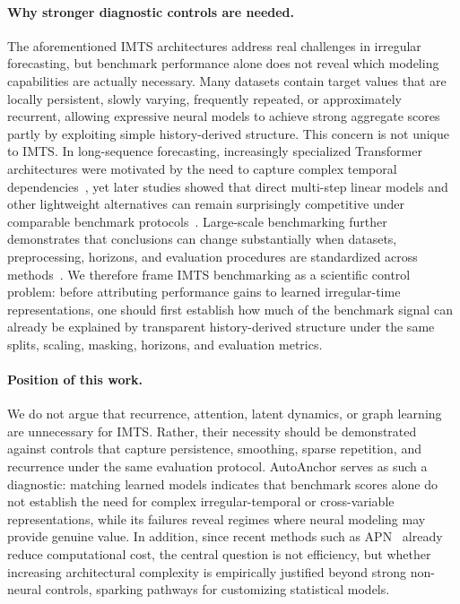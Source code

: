 \documentclass{article}
\begin{document}
\paragraph{Why stronger diagnostic controls are needed.}
The aforementioned IMTS architectures address real challenges in irregular forecasting, but benchmark performance alone does not reveal which modeling capabilities are actually necessary. Many datasets contain target values that are locally persistent, slowly varying, frequently repeated, or approximately recurrent, allowing expressive neural models to achieve strong aggregate scores partly by exploiting simple history-derived structure. This concern is not unique to IMTS. In long-sequence forecasting, increasingly specialized Transformer architectures were motivated by the need to capture complex temporal dependencies~\citep{informer}, yet later studies showed that direct multi-step linear models and other lightweight alternatives can remain surprisingly competitive under comparable benchmark protocols~\citep{Zeng2023LTSFLinear,SimpleTM2025}. Large-scale benchmarking further demonstrates that conclusions can change substantially when datasets, preprocessing, horizons, and evaluation procedures are standardized across methods~\citep{TFB2024}. We therefore frame IMTS benchmarking as a scientific control problem: before attributing performance gains to learned irregular-time representations, one should first establish how much of the benchmark signal can already be explained by transparent history-derived structure under the same splits, scaling, masking, horizons, and evaluation metrics.


\paragraph{Position of this work.}
We do not argue that recurrence, attention, latent dynamics, or graph learning are unnecessary for IMTS. Rather, their necessity should be demonstrated against controls that capture persistence, smoothing, sparse repetition, and recurrence under the same evaluation protocol. AutoAnchor serves as such a diagnostic: matching learned models indicates that benchmark scores alone do not establish the need for complex irregular-temporal or cross-variable representations, while its failures reveal regimes where neural modeling may provide genuine value. In addition, since recent methods such as APN~\citep{apn} already reduce computational cost, the central question is not efficiency, but whether increasing architectural complexity is empirically justified beyond strong non-neural controls, sparking pathways for customizing statistical models.
\end{document}

